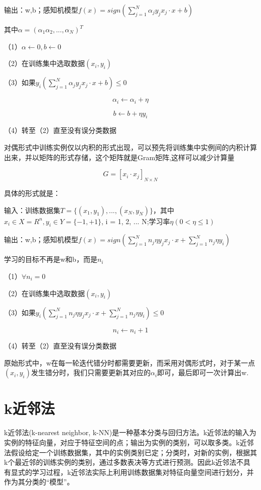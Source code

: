 \documentclass{ctexart}
\begin{document}
	输出：w,b；感知机模型\(f(x) = sign(\sum\limits_{j=1}^{N}\alpha_j y_j x_j·x + b)\)
	
	其中\(\alpha = (\alpha_1 \alpha_2, ..., \alpha_N)^T\)
	
	（1）\(\alpha \leftarrow 0, b \leftarrow 0\)
	
	（2）在训练集中选取数据\((x_i, y_i)\)
	
	（3）如果\(y_i(\sum\limits_{j=1}^{N}\alpha_j y_j x_j·x + b) \leq 0\)
	
	\[\alpha_i \leftarrow \alpha_i + \eta\]
	
	\[b \leftarrow b + \eta y_i\]
	
	（4）转至（2）直至没有误分类数据
	
	对偶形式中训练实例仅以内积的形式出现，可以预先将训练集中实例间的内积计算出来，并以矩阵的形式存储，这个矩阵就是Gram矩阵,这样可以减少计算量
	
	\[G = [x_i·x_j]_{N\times N}\]
	
	具体的形式就是：
	
	输入：训练数据集\(T = \{(x_1, y_1),..., (x_N, y_N)\}\)，其中\(x_i \in X = R^n, y_i \in Y = \{-1, +1\}\), i = 1, 2, ... N;学习率\(\eta (0 < \eta \leq 1)\)
	
	输出：w,b；感知机模型\(f(x) = sign(\sum\limits_{j=1}^{N}n_j \eta y_j x_j·x + \sum\limits_{j=1}^{N} n_j \eta y_i)\)
	
	学习的目标不再是w和b，而是\(n_i\)
	
	（1）\(\forall n_i = 0\)
	
	（2）在训练集中选取数据\((x_i, y_i)\)
	
	（3）如果\(y_i(\sum\limits_{j=1}^{N} n_j \eta y_j x_j·x + \sum\limits_{j=1}^{N} n_j \eta y_i) \leq 0\)
	
	\[n_i \leftarrow n_i + 1\]
	
	（4）转至（2）直至没有误分类数据
	
	原始形式中，w在每一轮迭代错分时都需要更新，而采用对偶形式时，对于某一点\((x_i,y_i)\)发生错分时，我们只需要更新其对应的\(\alpha_i\)即可，最后即可一次计算出w. 
	
	\section{k近邻法}
	
	k近邻法(k-nearest neighbor, k-NN)是一种基本分类与回归方法。k近邻法的输入为实例的特征向量，对应于特征空间的点；输出为实例的类别，可以取多类。k近邻法假设给定一个训练数据集，其中的实例类别已定；分类时，对新的实例，根据其k个最近邻的训练实例的类别，通过多数表决等方式进行预测。因此k近邻法不具有显式的学习过程，k近邻法实际上利用训练数据集对特征向量空间进行划分，并作为其分类的“模型”。
	
\end{document}
